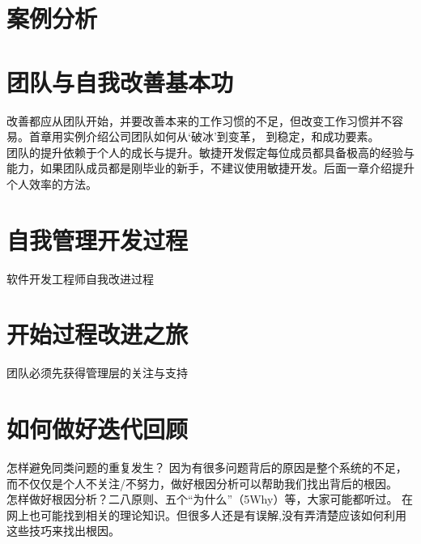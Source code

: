 \documentclass{book}        %
\begin{document}
\part{案例分析}



\part{团队与自我改善基本功}改善都应从团队开始，并要改善本来的工作习惯的不足，但改变工作习惯并不容易。首章用实例介绍公司团队如何从‘破冰’到变革， 到稳定，和成功要素。 \\
团队的提升依赖于个人的成长与提升。敏捷开发假定每位成员都具备极高的经验与能力，如果团队成员都是刚毕业的新手，不建议使用敏捷开发。后面一章介绍提升个人效率的方法。\\




\part{自我管理开发过程}软件开发工程师自我改进过程\\
















\part{开始过程改进之旅}团队必须先获得管理层的关注与支持\\





\part{如何做好迭代回顾}怎样避免同类问题的重复发生？ 因为有很多问题背后的原因是整个系统的不足， 而不仅仅是个人不关注/不努力，做好根因分析可以帮助我们找出背后的根因。\\

怎样做好根因分析？二八原则、五个“为什么”（5Why）等，大家可能都听过。 在网上也可能找到相关的理论知识。但很多人还是有误解,没有弄清楚应该如何利用这些技巧来找出根因。\\
\end{document}
